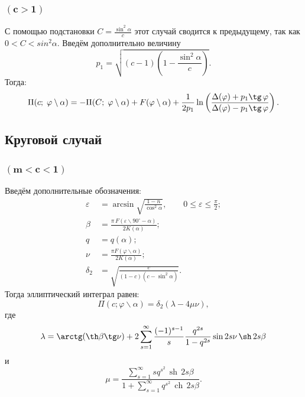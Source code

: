 \documentclass[fleqn]{article}
\begin{document}
	\subsubsection{$\mathbf{(c>1)}$}
	С помощью подстановки $C = \frac{\sin^2\alpha}{c}$ этот случай сводится к предыдущему, так как $0<C<sin^2\alpha$. Введём дополнительно величину 
	\begin{equation*}p_1={\sqrt{(c-1)\left(1-{\frac{\sin^2\alpha }{c}}\right)}}.\end{equation*}
	Тогда:
	\begin{equation*}\Pi (c;\;\varphi\setminus\alpha )=-\Pi (C;\;\varphi \setminus \alpha )+F(\varphi\setminus\alpha)+\frac {1}{2p_1}\ln \left({\frac {\Delta (\varphi )+p_1\tg \,\varphi}{\Delta(\varphi )-p_1\tg\,\varphi}}\right).\end{equation*}
	\subsection{Круговой случай}
	\subsubsection{$\mathbf{(m<c<1)}$}
	Введём дополнительные обозначения:
	\begin{align*}
		\varepsilon& = \arcsin\sqrt{\frac{1-n}{\cos^2\alpha}}, \qquad 0\leqslant\varepsilon\leqslant\frac{\pi}{2}; \\
		\beta& = \frac{\pi\,F(\varepsilon\backslash 90^\circ - \alpha)}{2K(\alpha)}; \\
		q&=q(\alpha); \\
		\nu& = \frac{\pi F(\varphi\backslash\alpha)}{2K(\alpha)}; \\
		\delta_2&=\sqrt{\frac{c}{(1-c)(c-\sin^2\alpha)}}.
	\end{align*}
	Тогда эллиптический интеграл равен:
	\begin{equation*}\Pi(c;\varphi\backslash\alpha)=\delta_2(\lambda-4\mu\nu),\end{equation*}
	где
	\begin{equation*}\lambda = \arctg(\th\beta\tg\nu)+ 2\sum_{s=1}^\infty \frac{(-1)^{s-1}}{s}\frac{q^{2s}}{1-q^{2s}}\sin{2s\nu}\,\sh\,{2s\beta}\end{equation*}
	и
	\begin{equation*}\mu ={\dfrac {\sum \limits _{s=1}^{\infty }sq^{s^{2}}\,\operatorname {sh} \,{2s\beta }}{1+\sum \limits _{s=1}^{\infty }q^{s^{2}}\,\operatorname {ch} \,{2s\beta }}}.\end{equation*}
\end{document}
